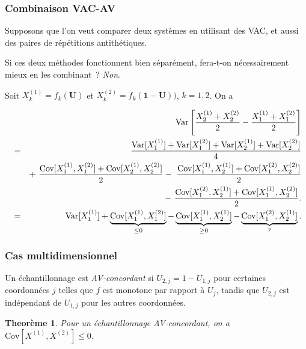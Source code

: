 \documentclass[t,usepdftitle=false]{beamer}
\def\bU{\boldsymbol{U}}
\def\bone{\boldsymbol{1}}
\def\Var{\mbox{Var}}
\def\Cov{\mbox{Cov}}
\newtheorem{thm}{Theorème}
\begin{document}
\begin{frame}
\frametitle{Combinaison VAC-AV}

Supposons que l'on veut comparer deux systèmes en utilisant des VAC, 
et aussi des paires de répétitions antithétiques.

Si ces deux méthodes fonctionnent bien séparément, 
fera-t-on nécessairement mieux en les combinant~? \emph{Non}.

Soit ${X^{(1)}_{k}} = f_k(\bU)$ et ${X^{(2)}_{k}} = f_k(\bone-\bU))$, %
$k = 1, 2$.  On a 
\begin{small}
\begin{eqnarray*}
 && \Var\left[\frac{ X^{(1)}_{2} + X^{(2)}_{2}}{2} 
            - \frac{ X^{(1)}_{1} + X^{(2)}_{1}}{2}\right] \\ 
 &=&  {\Var[X^{(1)}_{1}] + \Var[X^{(2)}_{1}]
     + \Var[X^{(1)}_{2}] + \Var[X^{(2)}_{2}] \over 4}\\
 && +~{\Cov[X^{(1)}_{1},X^{(2)}_{1}] + \Cov[X^{(1)}_{2},X^{(2)}_{2}] \over 2}
    -~{\Cov[X^{(1)}_{1},X^{(1)}_{2}] + \Cov[X^{(2)}_{1},X^{(2)}_{2}] \over 2}\\
 && -~{\Cov[X^{(2)}_{1},X^{(1)}_{2}] + \Cov[X^{(1)}_{1},X^{(2)}_{2}] \over 2}.\\
 &=&  \Var[X^{(1)}_{1}] 
    + \underbrace{\Cov[X^{(1)}_{1},X^{(2)}_{1}]}_{{\le 0}}
    - \underbrace{\Cov[X^{(1)}_{1},X^{(1)}_{2}]}_{{\ge 0}} 
    - \underbrace{\Cov[X^{(2)}_{1},X^{(1)}_{2}]}_{{?}}.
\end{eqnarray*}
\end{small}

\end{frame}

\begin{frame}
\frametitle{Cas multidimensionnel}

Un \'echantillonnage est \emph{AV-concordant} si $U_{2,j} = 1-U_{1,j}$ 
pour certaines coordonn\'ees $j$ telles que $f$ est monotone par rapport
\`a $U_j$, tandis que $U_{2,j}$ est ind\'ependant de $U_{1,j}$ pour les autres
coordonn\'ees. 

\mbox{}

\begin{thm}
Pour un \'echantillonnage AV-concordant, on a $\Cov[X^{(1)}, X^{(2)}] \le 0$.
\end{thm}



\end{frame}
\end{document}
